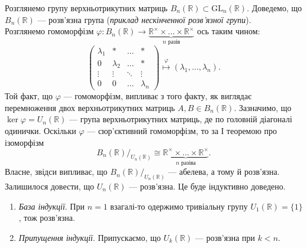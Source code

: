 \documentclass{math_library}
\begin{document}
\begin{example}
Розглянемо групу верхньотрикутних матриць $B_n(\mathbb{R}) \subset \mathrm{GL}_n(\mathbb{R})$. Доведемо, що $B_n(\mathbb{R})$ --- розв'язна група (\textit{приклад нескінченної розв'язної групи}).
\bigskip \\
Розглянемо гомоморфізм $\varphi \colon B_n(\mathbb{R}) \to \underbrace{\mathbb{R}^{\times} \times \dots \times \mathbb{R}^{\times}}_{\text{$n$ разів}}$ ось таким чином:
\[
\begin{pmatrix}
\lambda_1 & * & \dots & * \\
0 & \lambda_2 & \dots & * \\
\vdots & \vdots & \ddots & \vdots \\
0 & 0 & \dots & \lambda_n
\end{pmatrix} \overset{\varphi}{\mapsto} (\lambda_1,\dots,\lambda_n).
\]
Той факт, що $\varphi$ --- гомоморфізм, випливає з того факту, як виглядає перемноження двох верхньотрикутних матриць $A,B \in B_n(\mathbb{R})$. Зазначимо, що $\ker \varphi = U_n(\mathbb{R})$ --- група верхньотрикутних матриць, де по головній діагоналі одинички. Оскільки $\varphi$ --- сюр'єктивний гомоморфізм, то за І теоремою про ізоморфізм 
\[
{B_n(\mathbb{R})}/_{U_n(\mathbb{R})} \cong \underbrace{\mathbb{R}^{\times} \times \dots \times \mathbb{R}^{\times}}_{\text{$n$ разіва}}.
\]
Власне, звідси випливає, що ${B_n(\mathbb{R})}/_{U_n(\mathbb{R})}$ --- абелева, а тому й розв'язна.
\bigskip \\
Залишилося довести, що $U_n(\mathbb{R})$ --- розв'язна. Це буде індуктивно доведено.
\begin{enumerate}[nosep,wide=0pt,label={\Roman*.}]
\item \textit{База індукції}. При $n = 1$ взагалі-то одержимо тривіальну групу $U_1(\mathbb{R}) = \{1\}$, тож розв'язна.

\item \textit{Припущення індукції}. Припускаємо, що $U_k(\mathbb{R})$ --- розв'язна при $k < n$.


\end{enumerate}
\end{example}
\end{document}
